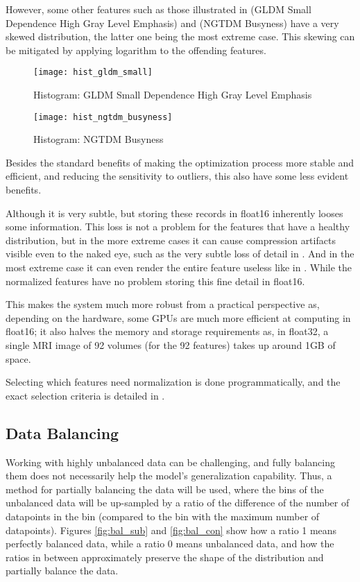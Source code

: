 However, some other features such as those illustrated in  (GLDM Small Dependence High Gray Level Emphasis) and  (NGTDM Busyness) have a very skewed distribution, the latter one being the most extreme case. This skewing can be mitigated by applying logarithm to the offending features.

\begin{figure}[H]
\centering
\texttt{[image: hist\_gldm\_small]}
\caption{Histogram: GLDM Small Dependence High Gray Level Emphasis}
\label{fig:hist_gls}
\end{figure}

\begin{figure}[H]
\centering
\texttt{[image: hist\_ngtdm\_busyness]}
\caption{Histogram: NGTDM Busyness}
\label{fig:hist_ngb}
\end{figure}

Besides the standard benefits of making the optimization process more stable and efficient, and reducing the sensitivity to outliers, this also have some less evident benefits.\par
Although it is very subtle, but storing these records in float16 inherently looses some information. This loss is not a problem for the features that have a healthy distribution, but in the more extreme cases it can cause compression artifacts visible even to the naked eye, such as the very subtle loss of detail in . And in the most extreme case it can even render the entire feature useless like in . While the normalized features have no problem storing this fine detail in float16.\par
This makes the system much more robust from a practical perspective as, depending on the hardware, some GPUs are much more efficient at computing in float16; it also halves the memory and storage requirements as, in float32, a single \ac{MRI} image of 92 volumes (for the 92 features) takes up around 1GB of space.\par
Selecting which features need normalization is done programmatically, and the exact selection criteria is detailed in .

\subsection{Data Balancing}

Working with highly unbalanced data can be challenging, and fully balancing them does not necessarily help the model's generalization capability. Thus, a method for partially balancing the data will be used, where the bins of the unbalanced data will be up-sampled by a ratio of the difference of the number of datapoints in the bin (compared to the bin with the maximum number of datapoints). Figures \ref{fig:bal_sub} and \ref{fig:bal_con} show how a ratio 1 means perfectly balanced data, while a ratio 0 means unbalanced data, and how the ratios in between approximately preserve the shape of the distribution and partially balance the data.

